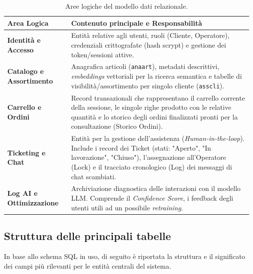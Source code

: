 \documentclass[a4paper, 11pt, oneside]{scrartcl}
\begin{document}
\begin{table}[H]
    \centering
    \renewcommand{\arraystretch}{1.5}
    \begin{tabularx}{\textwidth}{@{}lX@{}}
        \toprule
        \textbf{Area Logica} & \textbf{Contenuto principale e Responsabilità} \\
        \midrule
        \textbf{Identità e Accesso} & Entità relative agli utenti, ruoli (Cliente, Operatore), credenziali crittografate (hash scrypt) e gestione dei token/sessioni attive. \\
        \textbf{Catalogo e Assortimento} & Anagrafica articoli (\texttt{anaart}), metadati descrittivi, \textit{embeddings} vettoriali per la ricerca semantica e tabelle di visibilità/assortimento per singolo cliente (\texttt{asscli}). \\
        \textbf{Carrello e Ordini} & Record transazionali che rappresentano il carrello corrente della sessione, le singole righe prodotto con le relative quantità e lo storico degli ordini finalizzati pronti per la consultazione (Storico Ordini). \\
        \textbf{Ticketing e Chat} & Entità per la gestione dell'assistenza (\textit{Human-in-the-loop}). Include i record dei Ticket (stati: "Aperto", "In lavorazione", "Chiuso"), l'assegnazione all'Operatore (Lock) e il tracciato cronologico (Log) dei messaggi di chat scambiati. \\
        \textbf{Log AI e Ottimizzazione} & Archiviazione diagnostica delle interazioni con il modello LLM. Comprende il \textit{Confidence Score}, i feedback degli utenti utili ad un possibile \textit{retraining}. \\
        \bottomrule
    \end{tabularx}
    \caption{Aree logiche del modello dati relazionale.}
\end{table}

\subsection{Struttura delle principali tabelle}
In base allo schema SQL in uso, di seguito è riportata la struttura e il significato dei campi più rilevanti per le entità centrali del sistema.
\end{document}
